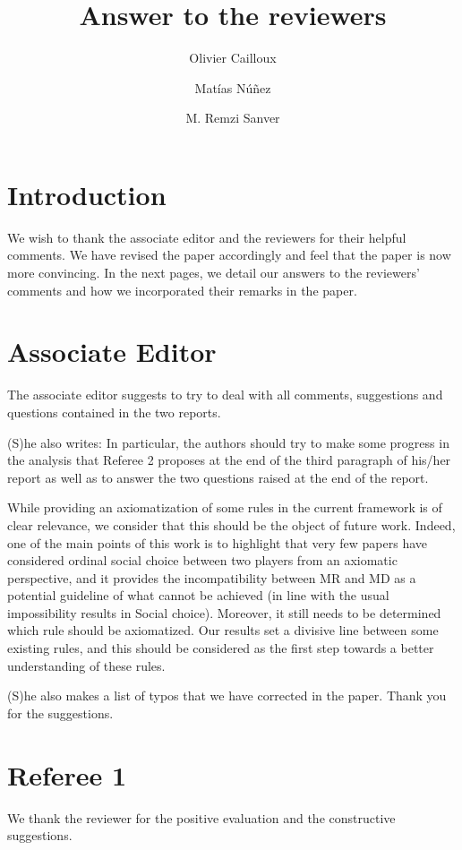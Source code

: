 \documentclass[pagesize, twoside=off, bibliography=totoc, DIV=calc, fontsize=12pt, a4paper]{scrartcl}
\title{Answer to the reviewers}
\author[*]{Olivier Cailloux}
\author[**]{Matías Núñez}
\author[*]{M. Remzi Sanver}
\affil[*]{Université Paris-Dauphine, PSL Research University, CNRS, LAMSADE, 75016 Paris, France.}
\affil[**]{CREST, CNRS, École Polytechnique, GENES, ENSAE Paris, Institut Polytechnique de Paris, 91120 Palaiseau, France.}
\date{}
\begin{document}
\maketitle

\section{Introduction}
We wish to thank the associate editor and the reviewers for their helpful comments. We have revised the paper accordingly and feel that the paper is now more convincing. In the next pages, we detail our answers to the reviewers’ comments and
how we incorporated their remarks in the paper.


\section{Associate Editor}

The associate editor suggests to try to deal with all comments,
suggestions and questions contained in the two reports.


(S)he also writes: In particular, the authors should try to
make some progress in the analysis that Referee 2 proposes at the end of the third paragraph of
his/her report as well as to answer the two questions raised at the end of the report.


While providing an axiomatization of some rules in the current framework is of clear relevance, we consider that this should be the object of future work. Indeed, one of the main points of this work is to highlight that very few papers have considered ordinal social choice between two players from an axiomatic perspective, and it provides the incompatibility between MR and MD as a potential guideline of what cannot be achieved (in line with the usual impossibility results in Social choice). Moreover, it still needs to be determined which rule should be axiomatized. Our results set a divisive line between some existing rules, and this should be considered as the first step towards a better understanding of these rules.




(S)he also makes a list of typos that we have corrected in the paper. Thank you for the suggestions.  






\section{Referee 1}
We thank the reviewer for the positive evaluation and the constructive suggestions.
\end{document}
